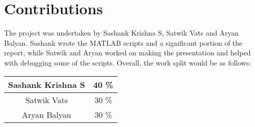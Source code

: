 \section{Contributions}

The project was undertaken by Sashank Krishna S, Satwik Vats and Aryan Balyan. Sashank wrote the MATLAB scripts and a significant portion of the report, while Satwik and Aryan worked on making the presentation and helped with debugging some of the scripts. Overall, the work split would be as follows:
\begin{center}
\begin{tabular}{ | c | c | }
	\hline
	Sashank Krishna S 	& 	40 \% \\
	\hline
	Satwik Vats 		& 	30 \% \\  
	\hline
	Aryan Balyan		&	30 \% \\
	\hline
\end{tabular}
\end{center}


